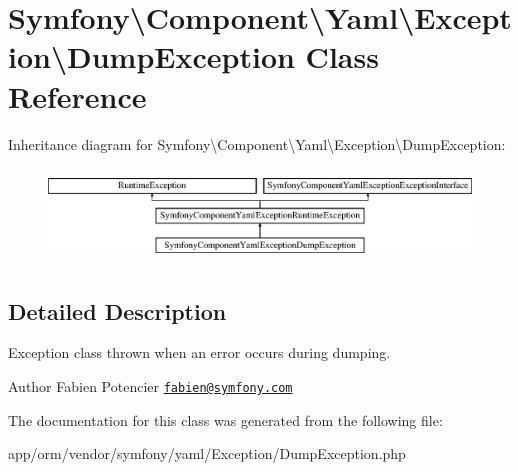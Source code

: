 \hypertarget{classSymfony_1_1Component_1_1Yaml_1_1Exception_1_1DumpException}{}\section{Symfony\textbackslash{}Component\textbackslash{}Yaml\textbackslash{}Exception\textbackslash{}Dump\+Exception Class Reference}
\label{classSymfony_1_1Component_1_1Yaml_1_1Exception_1_1DumpException}
Inheritance diagram for Symfony\textbackslash{}Component\textbackslash{}Yaml\textbackslash{}Exception\textbackslash{}Dump\+Exception\+:\begin{figure}[H]
\begin{center}
\leavevmode
\includegraphics[height=2.500000cm]{classSymfony_1_1Component_1_1Yaml_1_1Exception_1_1DumpException}
\end{center}
\end{figure}


\subsection{Detailed Description}
Exception class thrown when an error occurs during dumping.

\begin{DoxyAuthor}{Author}
Fabien Potencier \href{mailto:fabien@symfony.com}{\tt fabien@symfony.\+com} 
\end{DoxyAuthor}


The documentation for this class was generated from the following file\+:\begin{DoxyCompactItemize}
\item 
app/orm/vendor/symfony/yaml/\+Exception/Dump\+Exception.\+php\end{DoxyCompactItemize}
